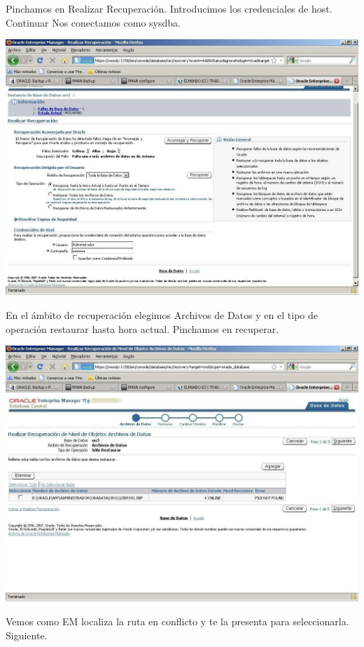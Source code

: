 \begin{enumerate}[1.]
\begin{center}
	\end{center}
	Pinchamos en Realizar Recuperación. Introducimos los credenciales de host. Continuar Nos conectamos como sysdba.
	\begin{center}
	\includegraphics[width=15cm]{./Imagenes/recu_3}  
	\end{center}
	En el ámbito de recuperación elegimos Archivos de Datos y en el tipo de operación restaurar hasta hora actual. Pinchamos en recuperar.
	\begin{center}
	\includegraphics[width=15cm]{./Imagenes/recu_4}  
	\end{center}	
	Vemos  como  EM  localiza  la  ruta  en  conflicto  y  te  la  presenta  para  seleccionarla. Siguiente.
	\begin{center}

\end{center}
\end{enumerate}
